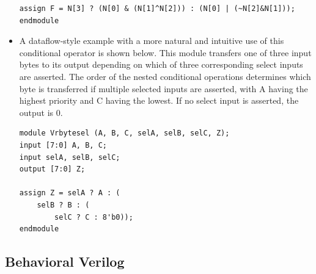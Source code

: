 \documentclass[10pt,a4paper]{article}
\begin{document}
\begin{itemize}
\begin{lstlisting}
assign F = N[3] ? (N[0] & (N[1]^N[2])) : (N[0] | (~N[2]&N[1]));
endmodule
\end{lstlisting}
\item A dataflow-style example with a more natural and intuitive use of this conditional operator is shown below. This module transfers one of three input bytes to its output depending on which of three corresponding select inputs are asserted. The order of the nested conditional operations determines which byte is transferred if multiple selected inputs are asserted, with A having the highest priority and C having the lowest. If no select input is asserted, the output is 0.
\begin{lstlisting}
module Vrbytesel (A, B, C, selA, selB, selC, Z);
input [7:0] A, B, C;
input selA, selB, selC;
output [7:0] Z;

assign Z = selA ? A : (
	selB ? B : (
		selC ? C : 8'b0));
endmodule
\end{lstlisting}
\end{itemize}
\subsection{Behavioral Verilog}
\end{document}
